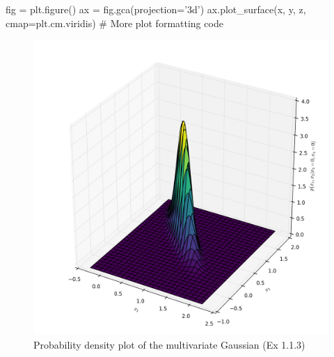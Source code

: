 \documentclass{article}
\begin{document}
\begin{enumerate}
\begin{python}
fig = plt.figure()
ax = fig.gca(projection='3d')
ax.plot_surface(x, y, z, cmap=plt.cm.viridis)
# More plot formatting code
\end{python}
\begin{figure}[H]
\centering
\includegraphics[width=.6\textwidth]{images/cond_mvg.png}
\caption{Probability density plot of the multivariate Gaussian (Ex 1.1.3)}
\label{fig:cond_mvg}
\end{figure}
\end{enumerate}
\pagebreak
\end{document}
